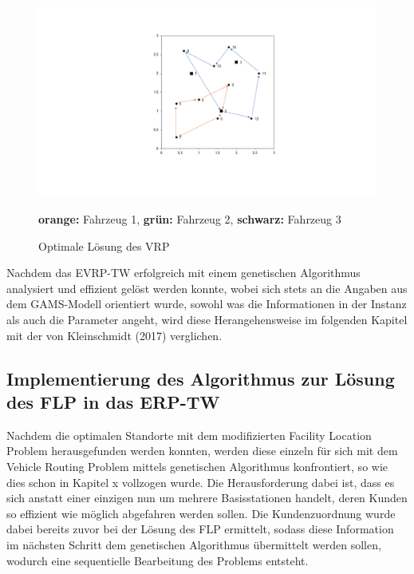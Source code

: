 \documentclass[a4paper,12pt,parskip,bibtotoc,liststotoc]{article}
\begin{document}
\begin{figure}[h!]
  \begin{center}
    \includegraphics[width=150mm]{vrp22.png}
    \caption{Optimale Lösung des VRP}  \label{Typen}
	{\footnotesize \textbf{orange:} Fahrzeug 1, \textbf{grün:} Fahrzeug 2, \textbf{schwarz:} Fahrzeug 3}
  \end{center}
\end{figure}




\newpage


Nachdem das EVRP-TW erfolgreich mit einem genetischen Algorithmus analysiert und effizient gelöst werden konnte, wobei sich stets an die Angaben aus dem GAMS-Modell orientiert wurde, sowohl was die Informationen in der Instanz als auch die Parameter angeht, wird diese Herangehensweise im folgenden Kapitel mit der von Kleinschmidt (2017) verglichen.


\subsection{Implementierung des Algorithmus zur Lösung des FLP in das ERP-TW}


Nachdem die optimalen Standorte mit dem modifizierten Facility Location Problem herausgefunden werden konnten, werden diese einzeln für sich mit dem Vehicle Routing Problem mittels genetischen Algorithmus konfrontiert, so wie dies schon in Kapitel x vollzogen wurde.
Die Herausforderung dabei ist, dass es sich anstatt einer einzigen nun um mehrere Basisstationen handelt, deren Kunden so effizient wie möglich abgefahren werden sollen.
Die Kundenzuordnung wurde dabei bereits zuvor bei der Lösung des FLP ermittelt, sodass diese Information im nächsten Schritt dem genetischen Algorithmus übermittelt werden sollen, wodurch eine sequentielle Bearbeitung des Problems entsteht.
\end{document}
